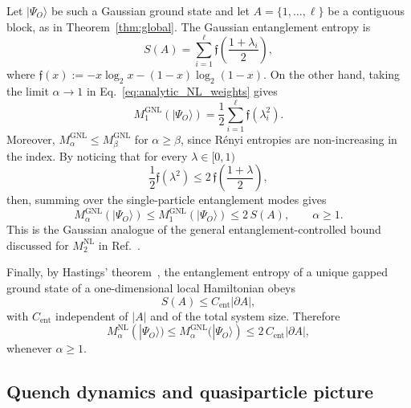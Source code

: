 \documentclass[prx,twocolumn,superscriptaddress,aps,10pt, frontmatterverbose, reprint,footinbib,longbibliography=true]{revtex4-2}
\newcommand{\RENYI}{\alpha}
\begin{document}
Let $|\Psi_O\rangle$ be such a Gaussian ground state and let $A=\{1,\dots,\ell\}$ be a contiguous block, as in Theorem~\ref{thm:global}. The Gaussian entanglement entropy is
\begin{equation}
    S(A)=
    \sum_{i=1}^{\ell}
    \mathfrak{f}\!\left(\frac{1+\lambda_i}{2}\right),
    \label{eq:gaussian_entropy_area_law_sec}
\end{equation}
where $\mathfrak{f}(x):=-x\log_2x-(1-x)\log_2(1-x)$. On the other hand, taking the limit \(\RENYI\to1\) in Eq.~\eqref{eq:analytic_NL_weights} gives
\begin{equation}
    M_{1}^{\mathrm{GNL}}(|\Psi_O\rangle)
    =
    \frac{1}{2}
    \sum_{i=1}^{\ell}
    \mathfrak{f}(\lambda_i^2).
    \label{eq:M1_GNL}
\end{equation}
Moreover, $M_{\alpha}^{\mathrm{GNL}}\le M_{\beta}^{\mathrm{GNL}}$ for $\alpha\ge\beta$, since R\'enyi entropies are non-increasing in the index. By noticing that for every $\lambda\in[0,1)$
\begin{equation}
    \frac{1}{2}\mathfrak{f}(\lambda^2)
    \le
    2\, \mathfrak{f}\!\left(\frac{1+\lambda}{2}\right),
    \label{eq:m1_entropy_bound}
\end{equation}
then, summing over the single-particle entanglement modes gives
\begin{equation}
    M_{\RENYI}^{\mathrm{GNL}}(|\Psi_O\rangle)
    \le
    M_{1}^{\mathrm{GNL}}(|\Psi_O\rangle)
    \le
    2\, S(A),
    \qquad
    \RENYI\ge1.
    \label{eq:GNL_bound_by_entropy_all_alpha}
\end{equation}
This is the Gaussian analogue of the general entanglement-controlled bound discussed for $M_2^{\mathrm{NL}}$ in Ref.~\cite{Cao_2025}.

Finally, by Hastings' theorem~\cite{Hastings_2007}, the entanglement entropy of a unique gapped ground state of a one-dimensional local Hamiltonian obeys
\begin{equation}
    S(A)\le C_{\mathrm{ent}}|\partial A|,
    \label{eq:Hastings_area_law}
\end{equation}
with $C_{\mathrm{ent}}$ independent of $|A|$ and of the total system size. Therefore
\begin{equation}
    M_{\RENYI}^{\mathrm{NL}}(|\Psi_O\rangle)
    \le
    M_{\RENYI}^{\mathrm{GNL}}(|\Psi_O\rangle)
    \le
    2\, C_{\mathrm{ent}}|\partial A|,
    \label{eq:GNL_area_law_final}
\end{equation}
whenever $\RENYI\ge1$. 

\subsection{Quench dynamics and quasiparticle picture}
\end{document}
